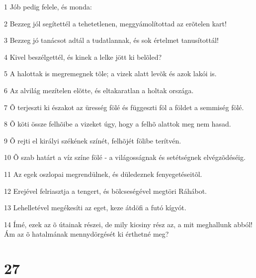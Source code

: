 \par 1 Jób pedig felele, és monda:
\par 2 Bezzeg jól segítettél a tehetetlenen, meggyámolítottad az erõtelen kart!
\par 3 Bezzeg jó tanácsot adtál a tudatlannak, és sok értelmet tanusítottál!
\par 4 Kivel beszélgettél, és kinek a lelke jött ki belõled?
\par 5 A halottak is megremegnek tõle; a vizek alatt levõk és azok lakói is.
\par 6 Az alvilág mezítelen elõtte, és eltakaratlan a holtak országa.
\par 7 Õ terjeszti ki északot az üresség fölé és függeszti föl a földet a semmiség fölé.
\par 8 Õ köti össze felhõibe a vizeket úgy, hogy a felhõ alattok meg nem hasad.
\par 9 Õ rejti el királyi székének színét, felhõjét fölibe terítvén.
\par 10 Õ szab határt a víz színe fölé - a világosságnak és setétségnek elvégzõdéséig.
\par 11 Az egek oszlopai megrendülnek, és düledeznek fenyegetéseitõl.
\par 12 Erejével felriasztja a tengert, és bölcseségével megtöri Ráhábot.
\par 13 Lehelletével megékesíti az eget, keze átdöfi a futó kígyót.
\par 14 Ímé, ezek az õ útainak részei, de mily kicsiny rész az, a mit meghallunk abból! Ám az õ hatalmának mennydörgését ki érthetné meg?

\chapter{27}

